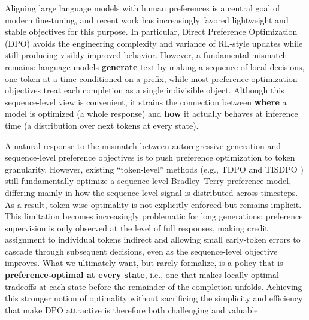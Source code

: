 \documentclass{article}
\theoremstyle{plain}
\theoremstyle{definition}
\theoremstyle{remark}
\begin{document}
Aligning large language models with human preferences is a central goal of modern fine-tuning, and recent work has increasingly favored lightweight and stable objectives for this purpose. In particular, Direct Preference Optimization (DPO) \cite{rafailov2023dpo} avoids the engineering complexity and variance of RL-style updates while still producing visibly improved behavior. However, a fundamental mismatch remains: language models \textbf{generate} text by making a sequence of local decisions, one token at a time conditioned on a prefix, while most preference optimization objectives treat each completion as a single indivisible object. Although this sequence-level view is convenient, it strains the connection between \textbf{where} a model is optimized (a whole response) and \textbf{how} it actually behaves at inference time (a distribution over next tokens at every state).

A natural response to the mismatch between autoregressive generation and sequence-level preference objectives is to push preference optimization to token granularity. However, existing “token-level” methods (e.g., TDPO \cite{zeng2024tokenleveldirectpreferenceoptimization} and TISDPO \cite{tis-dpo}) still fundamentally optimize a sequence-level Bradley–Terry preference model, differing mainly in how the sequence-level signal is distributed across timesteps. As a result, token-wise optimality is not explicitly enforced but remains implicit. This limitation becomes increasingly problematic for long generations: preference supervision is only observed at the level of full responses, making credit assignment to individual tokens indirect and allowing small early-token errors to cascade through subsequent decisions, even as the sequence-level objective improves. What we ultimately want, but rarely formalize, is a policy that is \textbf{preference-optimal at every state}, i.e., one that makes locally optimal tradeoffs at each state before the remainder of the completion unfolds. Achieving this stronger notion of optimality without sacrificing the simplicity and efficiency that make DPO attractive is therefore both challenging and valuable.

\end{document}

